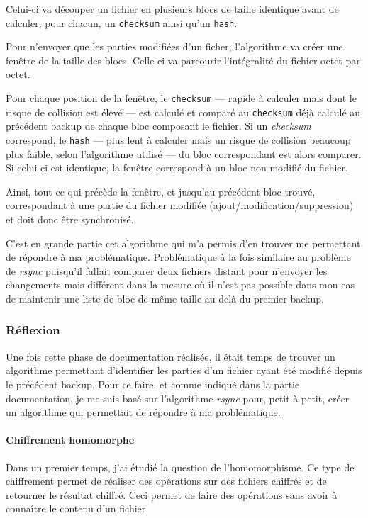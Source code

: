 \documentclass[a4paper,10pt, twoside]{report}
\begin{document}
\begin{spacing}{1.2}
Celui-ci va d\'ecouper un fichier en plusieurs blocs de taille identique avant
de calculer, pour chacun, un \texttt{checksum} ainsi qu'un \texttt{hash}.

Pour n'envoyer que les parties modifi\'ees d'un ficher, l'algorithme va cr\'eer
une fen\^etre de la taille des blocs. Celle-ci va parcourir l'int\'egralit\'e
du fichier octet par octet.

Pour chaque position de la fen\^etre, le \texttt{checksum} --- rapide \`a
calculer mais dont le risque de collision est \'elev\'e --- est calcul\'e et
compar\'e au \texttt{checksum} d\'ej\`a calcul\'e au pr\'ec\'edent backup de
chaque bloc composant le fichier. Si un \textit{checksum} correspond, le
\texttt{hash} --- plus lent \`a calculer mais un risque de collision beaucoup
plus faible, selon l'algorithme utilis\'e --- du bloc correspondant est alors
comparer. Si celui-ci est identique, la fen\^etre correspond \`a un bloc non
modifi\'e du fichier.

Ainsi, tout ce qui pr\'ec\`ede la fen\^etre, et jusqu'au pr\'ec\'edent bloc
trouv\'e, correspondant \`a une partie du fichier modifi\'ee
(ajout/modification/suppression) et doit donc \^etre synchronis\'e.

C'est en grande partie cet algorithme qui m'a permis d'en trouver me permettant
de r\'epondre \`a ma probl\'ematique. Probl\'ematique \`a la fois similaire au
probl\`eme de \textit{rsync} puisqu'il fallait comparer deux fichiers distant
pour n'envoyer les changements mais diff\'erent dans la mesure o\`u il n'est
pas possible dans mon cas de maintenir une liste de bloc de m\^eme taille au
del\`a du premier backup.

\subsubsection{R\'eflexion}
Une fois cette phase de documentation r\'ealis\'ee, il \'etait temps de trouver
un algorithme permettant d'identifier les parties d'un fichier ayant \'et\'e
modifi\'e depuis le pr\'ec\'edent backup. Pour ce faire, et comme indiqu\'e
dans la partie documentation, je me suis bas\'e sur l'algorithme \textit{rsync}
pour, petit \`a petit, cr\'eer un algorithme qui permettait de r\'epondre \`a ma
probl\'ematique.

\paragraph{Chiffrement homomorphe\\}
Dans un premier temps, j'ai \'etudi\'e la question de l'homomorphisme. Ce type
de chiffrement permet de r\'ealiser des op\'erations sur des fichiers chiffr\'es
et de retourner le r\'esultat chiffr\'e. Ceci permet de faire des op\'erations
sans avoir \`a conna\^itre le contenu d'un fichier.


\end{spacing}
\end{document}
